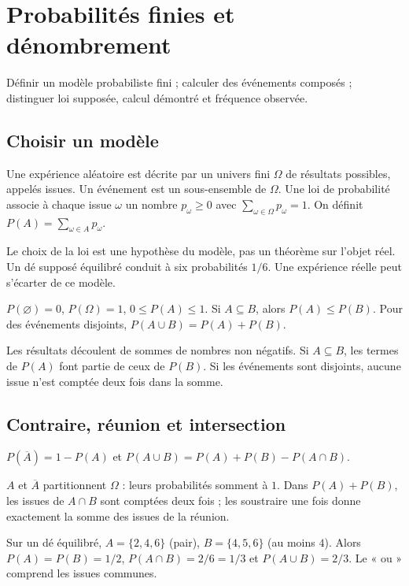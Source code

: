 \documentclass[../cours_2de.tex]{subfiles}
\begin{document}
\setcounter{chapter}{20}
\chapter{Probabilités finies et dénombrement}
\label{sec:ch21}
\begin{objectif}
Définir un modèle probabiliste fini ; calculer des événements composés ; distinguer loi supposée, calcul démontré et fréquence observée.
\end{objectif}
\section{Choisir un modèle}
Une expérience aléatoire est décrite par un univers fini $\Omega$ de résultats possibles, appelés issues.
Un événement est un sous-ensemble de $\Omega$.
Une loi de probabilité associe à chaque issue $\omega$ un nombre $p_\omega\geq0$ avec
$\sum_{\omega\in\Omega}p_\omega=1$.
On définit $P(A)=\sum_{\omega\in A}p_\omega$.
\begin{attention}
Le choix de la loi est une hypothèse du modèle, pas un théorème sur l'objet réel.
Un dé supposé équilibré conduit à six probabilités $1/6$. Une expérience réelle peut s'écarter de ce modèle.
\end{attention}
\begin{propriete}
$P(\varnothing)=0$, $P(\Omega)=1$, $0\leq P(A)\leq1$.
Si $A\subseteq B$, alors $P(A)\leq P(B)$.
Pour des événements disjoints, $P(A\cup B)=P(A)+P(B)$.
\end{propriete}
\begin{demonstration}
Les résultats découlent de sommes de nombres non négatifs.
Si $A\subseteq B$, les termes de $P(A)$ font partie de ceux de $P(B)$.
Si les événements sont disjoints, aucune issue n'est comptée deux fois dans la somme.
\end{demonstration}
\section{Contraire, réunion et intersection}
\begin{propriete}
$P(\overline A)=1-P(A)$ et
$P(A\cup B)=P(A)+P(B)-P(A\cap B)$.
\end{propriete}
\begin{demonstration}
$A$ et $\overline A$ partitionnent $\Omega$ : leurs probabilités somment à $1$.
Dans $P(A)+P(B)$, les issues de $A\cap B$ sont comptées deux fois ; les soustraire une fois donne exactement la somme des issues de la réunion.
\end{demonstration}
\begin{exemple}
Sur un dé équilibré, $A=\{2,4,6\}$ (pair), $B=\{4,5,6\}$ (au moins $4$).
Alors $P(A)=P(B)=1/2$, $P(A\cap B)=2/6=1/3$ et $P(A\cup B)=2/3$.
Le « ou » comprend les issues communes.
\end{exemple}
\end{document}
